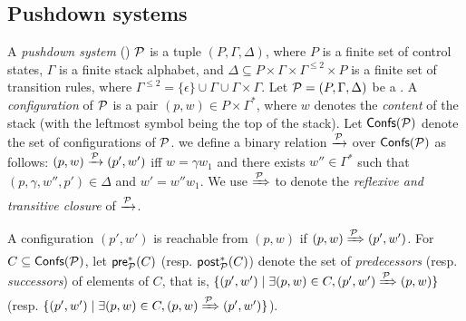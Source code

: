 %

\subsection{Pushdown systems}
A \emph{pushdown system} ({\PDS}) ${\mathcal{P} }$ is a tuple $(P,\Gamma,\Delta)$, where $P$ is a finite set of control states, $\Gamma$ is a finite stack alphabet, and $\Delta\subseteq P\times\Gamma\times\Gamma^{\le 2}\times P$ is a finite set of transition rules, where $\Gamma^{\le 2} = \{\epsilon\}\cup\Gamma\cup\Gamma\times\Gamma$.
Let ${\mathcal{P} }=(P,\Gamma,\Delta)$ be a {\PDS}. A \emph{configuration} of ${\mathcal{P} }$ is a pair $(p,w)\in P\times\Gamma^*$, where $w$ denotes the \emph{content} of the stack (with the leftmost symbol being the top of the stack). Let ${\mathsf{Confs} }({\mathcal{P} })$ denote the set of configurations of ${\mathcal{P} }$. we define a binary relation $\xrightarrow{{\mathcal{P} }}$ over ${\mathsf{Confs} }({\mathcal{P} })$ as follows: $(p,w)\xrightarrow{{\mathcal{P} }}(p',w')$ iff $w = \gamma w_1$ and there exists $w''\in\Gamma^*$ such that $(p,\gamma,w'',p')\in\Delta$ and $w'=w''w_1$. We use $\xRightarrow{{\mathcal{P} }}$ to denote the \emph{reflexive and transitive closure} of $\xrightarrow{{\mathcal{P} }}$.

A configuration $(p',w')$ is reachable from $(p,w)$ if $(p,w)\xRightarrow{{\mathcal{P} }}(p',w')$. For $C \subseteq {\mathsf{Confs} }({\mathcal{P} })$, let ${\mathsf{pre} }^*_{\mathcal{P} }(C)$ (resp. ${\mathsf{post} }^*_{\mathcal{P} }(C)$) denote the set of \emph{predecessors} (resp. \emph{successors}) of elements of $C$, that is, $\{(p',w')\mid \exists (p,w)\in C,(p',w')\xRightarrow{{\mathcal{P} }}(p,w)\}$ (resp. $\{(p',w')\mid \exists (p,w)\in C,(p,w)\xRightarrow{{\mathcal{P} }}(p',w')\}$).

